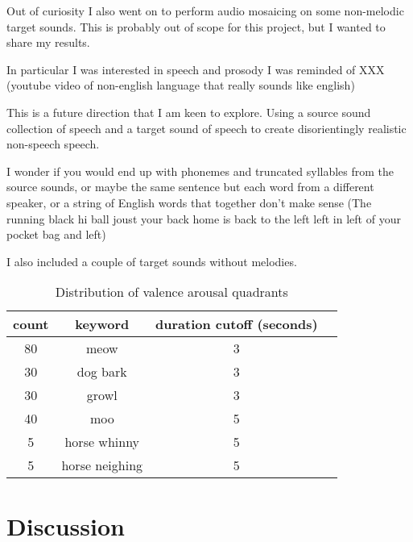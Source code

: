 \documentclass{article}
\begin{document}
Out of curiosity I also went on to perform audio mosaicing on some non-melodic target sounds. This is probably out of scope for this project, but I wanted to share my results. 

In particular I was interested in speech and prosody
I was reminded of XXX (youtube video of non-english language that really sounds like english)

This is a future direction that I am keen to explore. Using a source sound collection of speech and a target sound of speech to create disorientingly realistic non-speech speech.


I wonder if you would end up with phonemes and truncated syllables from the source sounds, or maybe the same sentence but each word from a different speaker, or a string of English words that together don’t make sense (The running black hi ball joust your back home is back to the left left in left of your pocket bag and left)



I also included a couple of target sounds without melodies.


\begin{table}
    \begin{center}
    \begin{tabular}{@{}cccc@{}}
        \toprule
        count & keyword & duration cutoff (seconds) \\
        \midrule
        80 & meow & 3 \\
        30 & dog bark & 3 \\
        30 & growl & 3 \\
        40 & moo & 5 \\
        5 & horse whinny & 5 \\
        5 & horse neighing & 5 \\
        \bottomrule
    \end{tabular}
    \end{center}
    \caption{Distribution of valence arousal quadrants}
    \label{tab:va-quadrants}
\end{table}

\section{Discussion}



\end{document}
